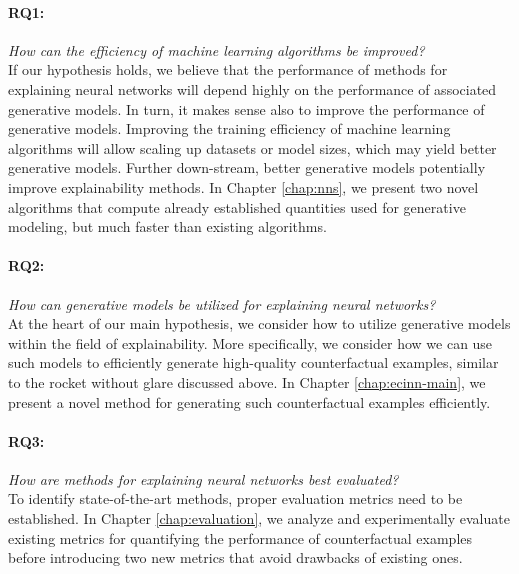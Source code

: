 \documentclass[11pt,a4paper,twoside,openright,final]{memoir}
\begin{document}
\paragraph{RQ1:} \emph{How can the efficiency of machine learning algorithms be improved?}\\
If our hypothesis holds, we believe that the performance of methods for explaining neural networks will depend highly on the performance of associated generative models. 
In turn, it makes sense also to improve the performance of generative models.
Improving the training efficiency of machine learning algorithms will allow scaling up datasets or model sizes, which may yield better generative models. 
Further down-stream, better generative models potentially improve explainability methods.
In Chapter \ref{chap:nns}, we present two novel algorithms that compute already established quantities used for generative modeling, but much faster than existing algorithms.  

\paragraph{RQ2:} \emph{How can generative models be utilized for explaining neural networks?}\\
At the heart of our main hypothesis, we consider how to utilize generative models within the field of explainability.
More specifically, we consider how we can use such models to efficiently generate high-quality counterfactual examples, similar to the rocket without glare discussed above.
In Chapter \ref{chap:ecinn-main}, we present a novel method for generating such counterfactual examples efficiently.

\paragraph{RQ3:} \emph{How are methods for explaining neural networks best evaluated?}\\
To identify state-of-the-art methods, proper evaluation metrics need to be established.
In Chapter \ref{chap:evaluation}, we analyze and experimentally evaluate existing metrics for quantifying the performance of counterfactual examples before introducing two new metrics that avoid drawbacks of existing ones. 

\end{document}
